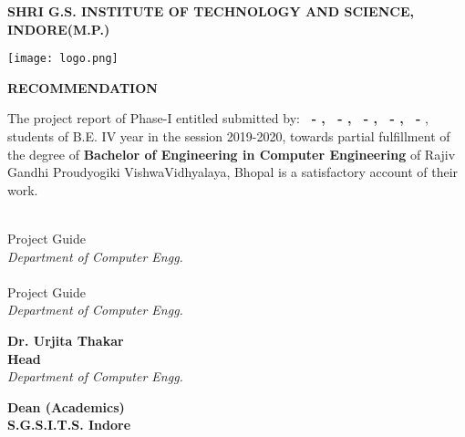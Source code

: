 \pagestyle{plain}
\large
\begin{center}
    


\textbf{SHRI G.S. INSTITUTE OF TECHNOLOGY AND SCIENCE, INDORE(M.P.)\\}

\vspace*{0.7cm}

\texttt{[image: logo.png]}

\vspace*{0.7cm}
\normalfont\LARGE\centering
\textbf{RECOMMENDATION} \\
\end{center}
\normalsize
The project report of Phase-I entitled \emph{\textbf{\projectTitle}} submitted by:
\textbf{
\rollA\ - \nameA,
\rollB\ - \nameB,
\rollC\ - \nameC,
\rollD\ - \nameD,
\rollE\ - \nameE},
students of B.E. IV year in the session 2019-2020, towards partial fulfillment of the degree of \textbf{Bachelor of Engineering in Computer Engineering} of Rajiv Gandhi Proudyogiki VishwaVidhyalaya, Bhopal is a satisfactory account of their work.



\begin{minipage}[t]{0.45\textwidth}
    \flushleft
    \vspace*{2cm}
    \textbf{\guide} \\
    Project Guide \\
    \emph{Department of Computer Engg.} \\
    \vspace*{2cm}
    \textbf{\coguide} \\
    Project Guide \\
    \emph{Department of Computer Engg.} \\
\end{minipage}
    \hfill
\begin{minipage}[t]{0.45\textwidth}
    \flushleft
    \vspace{2cm}
    \textbf{Dr. Urjita Thakar} \\
    \textbf{Head} \\
    \emph{Department of Computer Engg.} \\
    \vspace*{2.6cm}
    
    
    
\end{minipage}
    
    \vspace*{\fill}
    \begin{center}
    \textbf{Dean (Academics) \\
    S.G.S.I.T.S. Indore \\}    
    \end{center}
    


